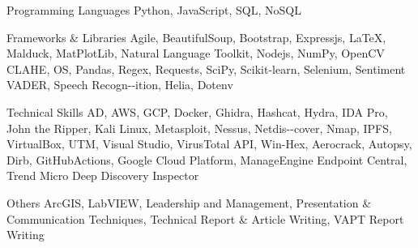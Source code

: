 \vspace{-5.0mm}         
\begin{cvskills}

\cvskill
   {Programming Languages} %
   {Python, JavaScript, SQL, NoSQL} %

\cvskill
    {Frameworks \& Libraries} %
    {Agile, BeautifulSoup, Bootstrap, Expressjs, \textrm{\LaTeX}, Malduck, MatPlotLib, Natural Language Toolkit, Nodejs, NumPy, \newline OpenCV CLAHE, OS, Pandas, Regex, Requests, SciPy, Scikit-learn, Selenium, Sentiment VADER, Speech Recogn-\newline -ition, Helia, Dotenv} %

\cvskill
    {Technical Skills} %
    {AD, AWS, GCP, Docker, Ghidra, Hashcat, Hydra, IDA Pro, John the Ripper, Kali Linux, Metasploit, Nessus, Netdis-\newline -cover, Nmap, IPFS, VirtualBox, UTM, Visual Studio, VirusTotal API, Win-Hex, Aerocrack, Autopsy, Dirb, GitHub\newline Actions, Google Cloud Platform, ManageEngine Endpoint Central, Trend Micro Deep Discovery Inspector} %

\cvskill
    {Others} %
    {ArcGIS, LabVIEW, Leadership and Management, Presentation \& Communication Techniques, Technical Report \& \newline Article Writing, VAPT Report Writing\newline} %

\vspace{-10.0mm}  
\end{cvskills}

